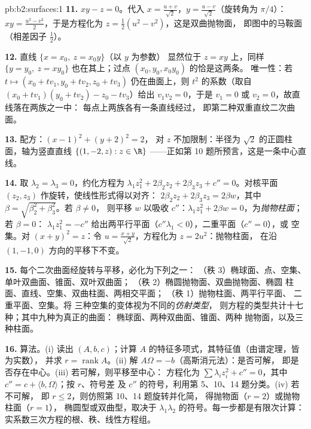 \begin{solution}{pb:b2:surfaces:1}
\textbf{11.} $xy - z = 0$。代入 $x = \frac{u +
v}{\sqrt2}$，$y = \frac{u - v}{\sqrt2}$（旋转角为 $\pi/4$）：
$xy = \frac{u^2 - v^2}2$，于是方程化为 $z =
\frac12(u^2 - v^2)$，这是双曲抛物面，
即图中的马鞍面（相差因子 $\frac12$）。

\textbf{12.} 直线 $\{x = x_0,\ z = x_0y\}$（以 $y$ 为参数）
显然位于 $z = xy$ 上，同样 $\{y = y_0,\ z =
xy_0\}$ 也在其上；过点 $(x_0, y_0, x_0y_0)$ 的恰是这两条。
唯一性：若 $t \mapsto (x_0 + tv_1, y_0 + tv_2, z_0 +
tv_3)$ 仍在曲面上，则 $t^2$ 的系数（取自 $(x_0
+ tv_1)(y_0 + tv_2) - z_0 - tv_3$）给出 $v_1v_2 = 0$，于是
$v_1 = 0$ 或 $v_2 = 0$，故直线落在两族之一中：
每点上两族各有一条直线经过，
即第二种双重直纹二次曲面。

\textbf{13.} 配方：$(x - 1)^2 + (y + 2)^2 = 2$，
对 $z$ 不加限制：半径为
$\sqrt2$ 的正圆柱面，轴为竖直直线 $\{(1, -2, z) : z \in
\R\}$ ——正如第 10 题所预言，这是一条中心直线。

\textbf{14.} 取 $\lambda_2 = \lambda_3 = 0$，约化方程为
$\lambda_1z_1^2 + 2\beta_2z_2 + 2\beta_3z_3 + c''
= 0$。对核平面 $(z_2, z_3)$ 作旋转，使线性形式得以对齐：
$2\beta_2z_2 + 2\beta_3z_3 = 2\beta w$，其中
$\beta = \sqrt{\beta_2^2 + \beta_3^2}$。若 $\beta \neq 0$，
则平移 $w$ 以吸收 $c''$：$\lambda_1z_1^2 + 2\beta w =
0$，为\emph{抛物柱面}；若 $\beta = 0$：
$\lambda_1z_1^2 = -c''$ 给出两平行平面（$c''
\lambda_1 < 0$），二重平面（$c'' = 0$），或
空集。对 $(x + y)^2 = z$：令 $u = \frac{x + y}{\sqrt2}$，方程化为
$z = 2u^2$：抛物柱面，
在沿 $(1, -1, 0)$ 方向的平移下不变。

\textbf{15.} 每个二次曲面经旋转与平移，必化为下列之一：
（秩 3）椭球面、点、空集、
单叶双曲面、锥面、双叶双曲面；
（秩 2）椭圆抛物面、双曲抛物面、椭圆
柱面、直线、空集、双曲柱面、两相交平面；
（秩 1）抛物柱面、两平行平面、
二重平面、空集。将
三种空集的变体视为不同的\emph{仿射类型}，
则方程的类型共计十七种；其中九种为真正的曲面：
椭球面、两种双曲面、锥面、两种
抛物面，以及三种柱面。

\textbf{16.} 算法。(i) 读出 $(A, b, c)$；计算
$A$ 的特征多项式，其特征值（由谱定理，皆为实数），
并求 $r = \operatorname{rank}A$。(ii)
解 $A\Omega = -b$（高斯消元法）：是否可解，
即是否存在中心。(iii) 若可解，则平移至中心：
方程化为 $\sum\lambda_iz_i^2 + c'' = 0$，其中 $c''
= c + \langle b, \Omega\rangle$；按 $r$、符号差
及 $c''$ 的符号，利用第 5、10、14 题分类。(iv) 若不可解，
即 $r \leq 2$，则仿照第 10、14 题旋转并化简，
得抛物面（$r = 2$）或抛物柱面（$r = 1$），
椭圆型或双曲型，取决于
$\lambda_1\lambda_2$ 的符号。每一步都是有限次计算：
实系数三次方程的根、秩、线性方程组。


\end{solution}
